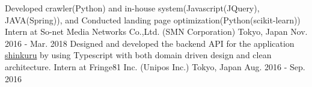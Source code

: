 \begin{cventries}
  \eduentry
    {Developed crawler(Python) and in-house system(Javascript(JQuery), JAVA(Spring)), and Conducted landing page optimization(Python(scikit-learn))} %
    {Intern at So-net Media Networks Co.,Ltd. (SMN Corporation)} %
    {Tokyo, Japan} %
    {Nov. 2016 - Mar. 2018} %
  \eduentry
    {Designed and developed the backend API for the application \href{https://apps.apple.com/jp/app/id1016332071?l=en}{shinkuru} by using Typescript with both domain driven design and clean architecture.} %
    {Intern at Fringe81 Inc. (Unipos Inc.)} %
    {Tokyo, Japan} %
    {Aug. 2016 - Sep. 2016} %
\end{cventries}

